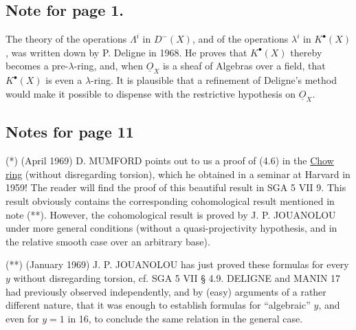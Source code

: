 
%
\subsection*{Note for page 1.}

The theory of the operations $\Lambda^i$ in $D^-(X)$, and of the operations $\lambda^i$ in $K^\bullet(X)$, was written down by P. Deligne in 1968. He proves that $K^\bullet(X)$ thereby becomes a pre-$\lambda$-ring, and, when $\underline{O}_X$ is a sheaf of Algebras over a field, that $K^\bullet(X)$ is even a $\lambda$-ring. It is plausible that a refinement of Deligne's method would make it possible to dispense with the restrictive hypothesis on $\underline{O}_X$.

\subsection*{Notes for page 11}

\noindent(*) (April 1969) D. MUMFORD points out to us a proof of (4.6) in the \uline{Chow ring} (without disregarding torsion), which he obtained in a seminar at Harvard in 1959! The reader will find the proof of this beautiful result in SGA 5 VII 9. This result obviously contains the corresponding cohomological result mentioned in note (**). However, the cohomological result is proved by J. P. JOUANOLOU under more general conditions (without a quasi-projectivity hypothesis, and in the relative smooth case over an arbitrary base).

\medskip

\noindent(**) (January 1969) J. P. JOUANOLOU has just proved these formulas for every $y$ without disregarding torsion, cf. SGA 5 VII \S{} 4.9. DELIGNE and MANIN 17 had previously observed independently, and by (easy) arguments of a rather different nature, that it was enough to establish formulas for ``algebraic'' $y$, and even for $y=1$ in 16, to conclude the same relation in the general case.

